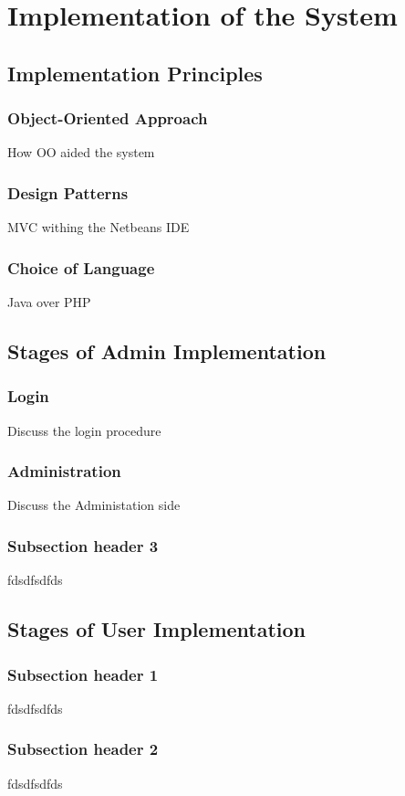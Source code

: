 \chapter{Implementation of the System}


\section{Implementation Principles}

\subsection{Object-Oriented Approach}
How OO aided the system
\subsection{Design Patterns}
MVC withing the Netbeans IDE
\subsection{Choice of Language}
Java over PHP


\section{Stages of Admin Implementation}

\subsection{Login}
Discuss the login procedure
\subsection{Administration}
Discuss the Administation side
\subsection{Subsection header 3}
fdsdfsdfds

\section{Stages of User Implementation}

\subsection{Subsection header 1}
fdsdfsdfds
\subsection{Subsection header 2}
fdsdfsdfds
